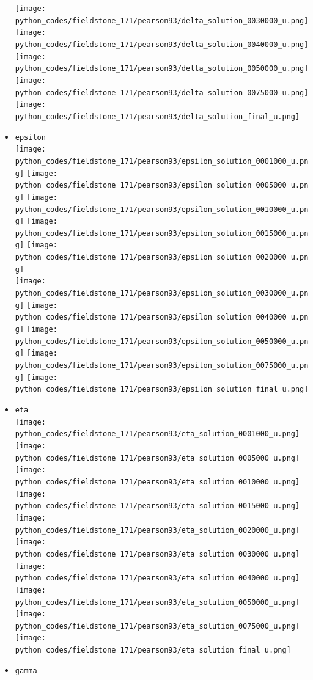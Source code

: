 \begin{itemize}
\texttt{[image: python\_codes/fieldstone\_171/pearson93/delta\_solution\_0030000\_u.png]}
\texttt{[image: python\_codes/fieldstone\_171/pearson93/delta\_solution\_0040000\_u.png]}
\texttt{[image: python\_codes/fieldstone\_171/pearson93/delta\_solution\_0050000\_u.png]}
\texttt{[image: python\_codes/fieldstone\_171/pearson93/delta\_solution\_0075000\_u.png]}
\texttt{[image: python\_codes/fieldstone\_171/pearson93/delta\_solution\_final\_u.png]}
\item {\tt epsilon}\\
\texttt{[image: python\_codes/fieldstone\_171/pearson93/epsilon\_solution\_0001000\_u.png]}
\texttt{[image: python\_codes/fieldstone\_171/pearson93/epsilon\_solution\_0005000\_u.png]}
\texttt{[image: python\_codes/fieldstone\_171/pearson93/epsilon\_solution\_0010000\_u.png]}
\texttt{[image: python\_codes/fieldstone\_171/pearson93/epsilon\_solution\_0015000\_u.png]}
\texttt{[image: python\_codes/fieldstone\_171/pearson93/epsilon\_solution\_0020000\_u.png]}\\
\texttt{[image: python\_codes/fieldstone\_171/pearson93/epsilon\_solution\_0030000\_u.png]}
\texttt{[image: python\_codes/fieldstone\_171/pearson93/epsilon\_solution\_0040000\_u.png]}
\texttt{[image: python\_codes/fieldstone\_171/pearson93/epsilon\_solution\_0050000\_u.png]}
\texttt{[image: python\_codes/fieldstone\_171/pearson93/epsilon\_solution\_0075000\_u.png]}
\texttt{[image: python\_codes/fieldstone\_171/pearson93/epsilon\_solution\_final\_u.png]}
\item {\tt eta}\\
\texttt{[image: python\_codes/fieldstone\_171/pearson93/eta\_solution\_0001000\_u.png]}
\texttt{[image: python\_codes/fieldstone\_171/pearson93/eta\_solution\_0005000\_u.png]}
\texttt{[image: python\_codes/fieldstone\_171/pearson93/eta\_solution\_0010000\_u.png]}
\texttt{[image: python\_codes/fieldstone\_171/pearson93/eta\_solution\_0015000\_u.png]}
\texttt{[image: python\_codes/fieldstone\_171/pearson93/eta\_solution\_0020000\_u.png]}\\
\texttt{[image: python\_codes/fieldstone\_171/pearson93/eta\_solution\_0030000\_u.png]}
\texttt{[image: python\_codes/fieldstone\_171/pearson93/eta\_solution\_0040000\_u.png]}
\texttt{[image: python\_codes/fieldstone\_171/pearson93/eta\_solution\_0050000\_u.png]}
\texttt{[image: python\_codes/fieldstone\_171/pearson93/eta\_solution\_0075000\_u.png]}
\texttt{[image: python\_codes/fieldstone\_171/pearson93/eta\_solution\_final\_u.png]}
\item {\tt gamma}\\

\end{itemize}
